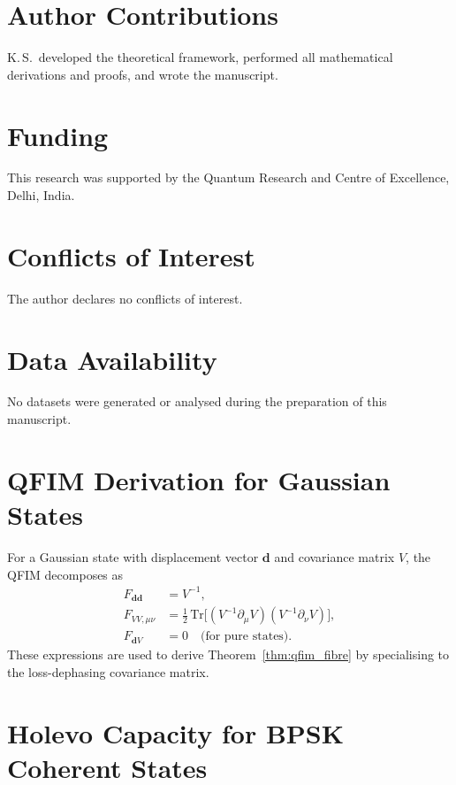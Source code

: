\documentclass[journal,twocolumn]{IEEEtran}
\theoremstyle{definition}
\theoremstyle{plain}
\newcommand{\Tr}{\mathrm{Tr}}
\begin{document}
\section*{Author Contributions}

K.\,S.\ developed the theoretical framework, performed all
mathematical derivations and proofs, and wrote the manuscript.

\section*{Funding}

This research was supported by the Quantum Research and Centre of
Excellence, Delhi, India.

\section*{Conflicts of Interest}

The author declares no conflicts of interest.

\section*{Data Availability}

No datasets were generated or analysed during the preparation of
this manuscript.

\appendices

\section{QFIM Derivation for Gaussian States}
\label{app:qfim}

For a Gaussian state with displacement vector $\mathbf{d}$ and
covariance matrix $V$, the QFIM decomposes as
\begin{align}
  F_{\mathbf{d}\mathbf{d}} &= V^{-1}, \label{eq:Fdd}\\
  F_{VV,\mu\nu} &= \tfrac{1}{2}\,\Tr\!\bigl[(V^{-1}\partial_\mu V)
    (V^{-1}\partial_\nu V)\bigr], \label{eq:FVV}\\
  F_{\mathbf{d}V} &= 0 \quad \text{(for pure states)}. \label{eq:FdV}
\end{align}
These expressions are used to derive Theorem~\ref{thm:qfim_fibre} by
specialising to the loss-dephasing covariance matrix.

\section{Holevo Capacity for BPSK Coherent States}
\label{app:holevo_bpsk}
\end{document}

